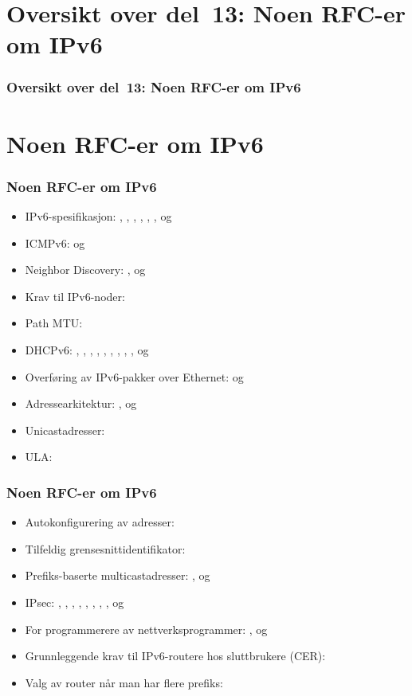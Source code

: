 \begin{frame}
  \partpage
\end{frame}

\section*{Oversikt over del~13: Noen RFC-er om IPv6}
\begin{frame}
  \frametitle{Oversikt over del~13: Noen RFC-er om IPv6}
    \tableofcontents
\end{frame}

\section{Noen RFC-er om IPv6}
\begin{frame}
  \frametitle{Noen RFC-er om IPv6}
  \begin{itemize}
  \item IPv6-spesifikasjon: , , ,
    , , ,  og 
  \item ICMPv6:  og 
  \item Neighbor Discovery: ,  og 
  \item Krav til IPv6-noder: 
  \item Path MTU: 
  \item DHCPv6: , , , ,
    , , , , ,
     og 
  \item Overføring av IPv6-pakker over Ethernet:  og
  \item Adressearkitektur: ,  og 
  \item Unicastadresser: 
  \item ULA: 
  \end{itemize}
\end{frame}

\begin{frame}
  \frametitle{Noen RFC-er om IPv6}
  \begin{itemize}
  \item Autokonfigurering av adresser: 
  \item Tilfeldig grensesnittidentifikator: 
  \item Prefiks-baserte multicastadresser: ,  og
  \item IPsec: , , , ,
    , , , ,  og
  \item For programmerere av nettverksprogrammer: ,
     og 
  \item Grunnleggende krav til IPv6-routere hos sluttbrukere (CER):
  \item Valg av router når man har flere prefiks: 
  \end{itemize}
\end{frame}


